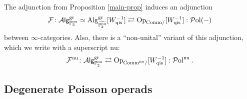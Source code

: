 \documentclass[10pt, oneside]{amsart}
\theoremstyle{plain}
\newcommand{\alg}{\mathrm{Alg}}
\newcommand{\Alg}{\mathcal{A}\text{\sf lg}}
\newcommand{\comm}{\mathrm{Comm}}
\newcommand{\F}{\mathcal{F}}
\newcommand{\gr}{\mathrm{gr}}
\renewcommand{\nu}{\mathrm{nu}}
\newcommand{\op}{\mathrm{Op}}
\newcommand{\PP}{\mathbb{P}}
\newcommand{\Pol}{\mathcal{P}\mathrm{ol}}
\newcommand{\tP}{{\widetilde{\mathbb{P}^\mathrm{nu}_2}}}
\begin{document}
\begin{notation}
The adjunction from Proposition \ref{main-prop} induces an adjunction
\begin{equation*}
\F \colon \Alg^\gr_{\PP^\nu_2} \simeq \alg^\gr_{\tP}[W^{-1}_\mathrm{qis}] \rightleftarrows \op_{\comm/}[W^{-1}_\mathrm{qis}] : \Pol(-)
\end{equation*}
between $\infty$-categories. Also, there is a ``non-unital'' variant of this adjunction, which we write with a superscript $\nu$:
\begin{equation*}
\F^\nu \colon \Alg^\gr_{\PP^\nu_2} \rightleftarrows \op_{\comm^\nu/}[W^{-1}_\mathrm{qis}] : \Pol^\nu \:.
\end{equation*}
\end{notation}

\subsection{Degenerate Poisson operads}
\end{document}
